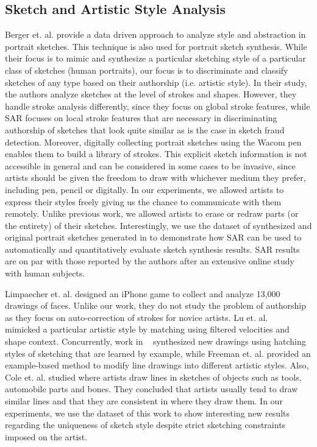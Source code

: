 \subsection{Sketch and Artistic Style Analysis}\label{subsec: artisticanalysis}
\vspace{-2mm}
Berger et. al.  provide a data driven approach to analyze style and abstraction in portrait sketches. This technique is also used for portrait sketch synthesis. While their focus is to mimic and synthesize a particular sketching style of a particular class of sketches (human portraits), our focus is to discriminate and classify sketches of any type based on their authorship (i.e. artistic style). In their study, the authors analyze sketches at the level of strokes and shapes. However, they handle stroke analysis differently, since they focus on global stroke features, while SAR focuses on local stroke features that are necessary in discriminating authorship of sketches that look quite similar as is the case in sketch fraud detection. Moreover, digitally collecting portrait sketches using the Wacom pen enables them to build a library of strokes. This explicit sketch information is not accessible in general and can be considered in some cases to be invasive, since artists should be given the freedom to draw with whichever medium they prefer, including pen, pencil or digitally. In our experiments, we allowed artists to express their styles freely giving us the chance to communicate with them remotely. Unlike previous work, we allowed artists to erase or redraw parts (or the entirety) of their sketches. Interestingly, we use the dataset of synthesized and original portrait sketches generated in \cite{Berger:2013:SAP:2461912.2461964} to demonstrate how SAR can be used to automatically and quantitatively evaluate sketch synthesis results. SAR results are on par with those reported by the authors after an extensive online study with human subjects.

Limpaecher et. al. \cite{Limpaecher:2013:RDA:2461912.2462016} designed an iPhone game to collect and analyze 13,000 drawings of faces. Unlike our work, they do not study the problem of authorship as they focus on auto-correction of strokes for novice artists. Lu et. al. ~\cite{Lu:2012:HES} mimicked a particular artistic style by matching using filtered velocities and shape context. Concurrently, work in ~\cite{Kalogerakis:2012:mlhatching} synthesized new drawings using hatching styles of sketching that are learned by example, while Freeman et. al.  provided an example-based method to modify line drawings into different artistic styles. Also, Cole et. al.  studied where artists draw lines in sketches of objects such as tools, automobile parts and bones. They concluded that artists usually tend to draw similar lines and that they are consistent in where they draw them. In our experiments, we use the dataset of this work to show interesting new results regarding the uniqueness of sketch style despite strict sketching constraints imposed on the artist.

